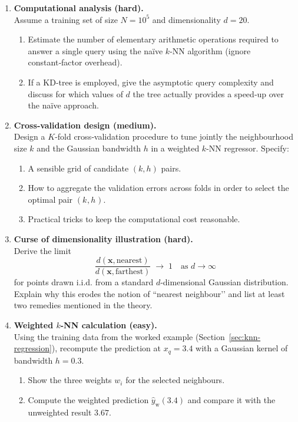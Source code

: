 \documentclass[12pt, a4paper]{article}
\begin{document}
\begin{enumerate}[label=\textbf{Q\arabic.}, leftmargin=, itemsep=12pt]
\item \textbf{Computational analysis (hard).}\\
Assume a training set of size \(N=10^{5}\) and dimensionality \(d=20\).  
\begin{enumerate}[label=(\alph)]
\item Estimate the number of elementary arithmetic operations required to answer a single query using the naïve \(k\)-NN algorithm (ignore constant‑factor overhead).  
\item If a KD‑tree is employed, give the asymptotic query complexity and discuss for which values of \(d\) the tree actually provides a speed‑up over the naïve approach.
\end{enumerate}

\item \textbf{Cross‑validation design (medium).}\\
Design a \(K\)-fold cross‑validation procedure to tune jointly the neighbourhood size \(k\) and the Gaussian bandwidth \(h\) in a weighted \(k\)-NN regressor.  Specify:
\begin{enumerate}[label=(\alph)]
\item A sensible grid of candidate \((k,h)\) pairs.  
\item How to aggregate the validation errors across folds in order to select the optimal pair \((k^{},h^{})\).  
\item Practical tricks to keep the computational cost reasonable.
\end{enumerate}

\item \textbf{Curse of dimensionality illustration (hard).}\\
Derive the limit
\[
\frac{d(\mathbf{x},\text{nearest})}{d(\mathbf{x},\text{farthest})}
\;\longrightarrow\;1 \quad\text{as } d\to\infty
\]
for points drawn i.i.d. from a standard \(d\)-dimensional Gaussian distribution.  Explain why this erodes the notion of “nearest neighbour’’ and list at least two remedies mentioned in the theory.

\item \textbf{Weighted \(k\)-NN calculation (easy).}\\
Using the training data from the worked example (Section~\ref{sec:knn-regression}), recompute the prediction at \(x_{q}=3.4\) with a Gaussian kernel of bandwidth \(h=0.3\).  
\begin{enumerate}[label=(\alph)]
\item Show the three weights \(w_i\) for the selected neighbours.  
\item Compute the weighted prediction \(\hat y_{\text{w}}(3.4)\) and compare it with the unweighted result \(3.67\).
\end{enumerate}


\end{enumerate}
\end{document}
